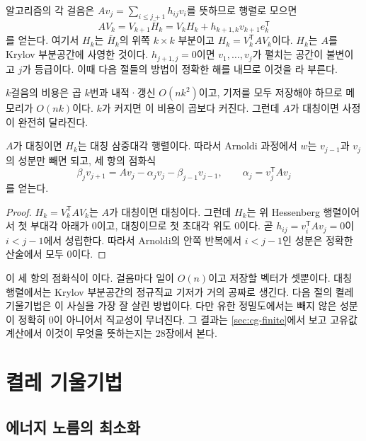 알고리즘의 각 걸음은 $Av_j=\sum_{i\le j+1}h_{ij}v_i$를 뜻하므로 행렬로 모으면 
\begin{equation}
\label{eq:arnoldi}
AV_k=V_{k+1}\bar H_k=V_kH_k+h_{k+1,k}v_{k+1}e_k^{\mathsf T}
\end{equation}
를 얻는다. 여기서 $H_k$는 $\bar H_k$의 위쪽 $k\times k$ 부분이고 $H_k=V_k^{\mathsf T}AV_k$이다. $H_k$는 $A$를 Krylov 부분공간에 사영한 것이다. $h_{j+1,j}=0$이면 $v_1,\dots,v_j$가 펼치는 공간이 불변이고 $j$가 등급이다. 이때 다음 절들의 방법이 정확한 해를 내므로 이것을 라 부른다.

$k$걸음의 비용은 곱 $k$번과 내적·갱신 $O(nk^2)$이고, 기저를 모두 저장해야 하므로 메모리가 $O(nk)$이다. $k$가 커지면 이 비용이 곱보다 커진다. 그런데 $A$가 대칭이면 사정이 완전히 달라진다.

\begin{proposition}
\label{prop:lanczos-tridiagonal}
$A$가 대칭이면 $H_k$는 대칭 삼중대각 행렬이다. 따라서 Arnoldi 과정에서 $w$는 $v_{j-1}$과 $v_j$의 성분만 빼면 되고, 세 항의 점화식
\[
\beta_{j}v_{j+1}=Av_j-\alpha_jv_j-\beta_{j-1}v_{j-1},\qquad\alpha_j=v_j^{\mathsf T}Av_j
\]
를 얻는다.
\end{proposition}

\begin{proof}
$H_k=V_k^{\mathsf T}AV_k$는 $A$가 대칭이면 대칭이다. 그런데 $H_k$는 위 Hessenberg 행렬이어서 첫 부대각 아래가 $0$이고, 대칭이므로 첫 초대각 위도 $0$이다. 곧 $h_{ij}=v_i^{\mathsf T}Av_j=0$이 $i<j-1$에서 성립한다. 따라서 Arnoldi의 안쪽 반복에서 $i<j-1$인 성분은 정확한 산술에서 모두 $0$이다.
\end{proof}

이 세 항의 점화식이 이다\cite{lanczos1950}. 걸음마다 일이 $O(n)$이고 저장할 벡터가 셋뿐이다. 대칭 행렬에서는 Krylov 부분공간의 정규직교 기저가 거의 공짜로 생긴다. 다음 절의 켤레 기울기법은 이 사실을 가장 잘 살린 방법이다. 다만 유한 정밀도에서는 빼지 않은 성분이 정확히 $0$이 아니어서 직교성이 무너진다. 그 결과는 \cref{sec:cg-finite}에서 보고 고유값 계산에서 이것이 무엇을 뜻하는지는 28장에서 본다.

\section{켤레 기울기법}
\label{sec:cg}

\subsection{에너지 노름의 최소화}

